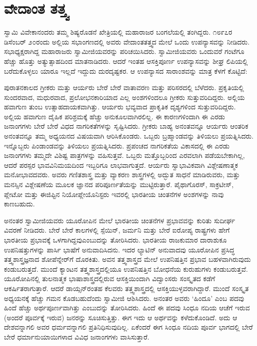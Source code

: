 
\chapter{ವೇದಾಂತ ತತ್ತ್ವ}

ಸ್ವಾಮಿ ವಿವೇಕಾನಂದರು ತಮ್ಮ ಶಿಷ್ಯರೊಡನೆ ಖೇತ್ರಿಯಲ್ಲಿ ಮಹಾರಾಜರ ಬಂಗಲೆಯಲ್ಲಿ ತಂಗಿದ್ದರು. ೧೮೯೭ರ ಡಿಸೆಂಬರ್​ ೨೦ರಂದು ಅಲ್ಲಿಯ ಸಭಾಂಗಣದಲ್ಲಿ ಅವರು ವೇದಾಂತತತ್ತ್ವದ ಮೇಲೆ ಒಂದು ಉಪನ್ಯಾಸವನ್ನು ನೀಡಿದರು. ಸಭಾಧ್ಯಕ್ಷರಾಗಿದ್ದ ಮಹಾರಾಜರು ಸ್ವಾಮೀಜಿಯವರನ್ನು ಪರಿಚಯಿಸಿದರು. ಸ್ವಾಮೀಜಿಯವರು ಒಂದುವರೆ ಗಂಟೆಗೂ ಹೆಚ್ಚು ಹೊತ್ತು ಅತ್ಯುತ್ಸಾಹದಿಂದ ಮಾತನಾಡಿದರು. ಆದರೆ ಇಂತಹ ಆಸಕ್ತಿಪೂರ್ಣ ಉಪನ್ಯಾಸವನ್ನು ಶೀಘ್ರ ಲಿಪಿಯಲ್ಲಿ ಬರೆದುಕೊಳ್ಳಲು ಯಾರೂ ಇಲ್ಲದೆ ಇದ್ದುದು ದುರದೃಷ್ಟಕರ. ಆ ಉಪನ್ಯಾಸದ ಸಾರಾಂಶವನ್ನು ಮಾತ್ರ ಕೆಳಗೆ ಕೊಟ್ಟಿದೆ:

\vskip 5pt

ಪುರಾತನಕಾಲದ ಗ್ರೀಕರು ಮತ್ತು ಆರ್ಯರು ಬೇರೆ ಬೇರೆ ವಾತಾವರಣ ಮತ್ತು ಪರಿಸರದಲ್ಲಿ ಬೆಳೆದರು. ಪ್ರಕೃತಿಯಲ್ಲಿ ಸುಂದರವಾದ, ಮಧುರವಾದ, ಪ್ರಲೋಭನಕಾರಿಯಾದ ಎಲ್ಲ ಅಂಶಗಳಿಂದಲೂ ಗ್ರೀಕರು ಸುತ್ತುವರಿದಿದ್ದರು. ಅಲ್ಲಿಯ ಹವಾಗುಣ ತುಂಬ ಉತ್ಸಾಹದಾಯಕವಾಗಿತ್ತು. ಆರ್ಯರು ಭವ್ಯವಾದ ಪ್ರಾಕೃತಿಕ ದೃಶ್ಯಗಳಿಂದ ಸುತ್ತುವರಿದಿದ್ದರು. ಅಲ್ಲಿಯ ಹವಾಗುಣ ದೈಹಿಕ ಪರಿಶ್ರಮಕ್ಕೆ ಹೆಚ್ಚು ಅನುಕೂಲವಾಗಿರಲಿಲ್ಲ. ಈ ಕಾರಣಗಳಿಂದಾಗಿ ಈ ಎರಡು ಜನಾಂಗಗಳು ಬೇರೆ ಬೇರೆ ವಿಧದ ನಾಗರಿಕತೆ\break ಗಳನ್ನು ಸೃಷ್ಟಿಸಿದರು. ಗ್ರೀಕರು ಬಾಹ್ಯ ಅನಂತವನ್ನೂ ಆರ್ಯರು ಆಂತರಿಕ ಅನಂತವನ್ನೂ ತಮ್ಮ ಅಧ್ಯಯನದ ವಿಷಯವಾಗಿ ಆರಿಸಿಕೊಂಡರು. ಒಬ್ಬರು ಬ್ರಹ್ಮಾಂಡವನ್ನು ತಿಳಿಯಲು ಪ್ರಯತ್ನಿಸಿದರು. ಇನ್ನೊಬ್ಬರು ಪಿಂಡಾಂಡವನ್ನು ತಿಳಿಯಲು ಪ್ರಯತ್ನಿಸಿದರು. ಪ್ರಪಂಚದ ನಾಗರಿಕತೆಯ ವಿಕಾಸದಲ್ಲಿ ಈ ಎರಡು ಜನಾಂಗಗಳು ತಮ್ಮದೇ ವಿಶಿಷ್ಟ ಪಾತ್ರಗಳನ್ನು ವಹಿಸುತ್ತವೆ. ಒಬ್ಬರು ಮತ್ತೊಬ್ಬರಿಂದ ಎರವಲಾಗಿ ಪಡೆಯಬೇಕಾಗಿಲ್ಲ, ಆದರೆ ಪರಸ್ಪರ ಭಾವವಿನಿಮಯದಿಂದ ಇಬ್ಬರಿಗೂ ಲಾಭವಾಗುತ್ತದೆ. ಆರ್ಯರು ಸ್ವಾಭಾವಿಕವಾಗಿ ವಿಶ್ಲೇಷಣಾತ್ಮಕ ಮನೋಭಾವದವರು. ಅವರು ಗಣಿತಶಾಸ್ತ್ರ ಮತ್ತು ವ್ಯಾಕರಣ ಶಾಸ್ತ್ರಗಳಲ್ಲಿ ಅದ್ಭುತ ಸಾಧನೆ ಮಾಡಿರುವರು, ಮತ್ತು ಮನಸ್ಸಿನ ವಿಶ್ಲೇಷಣೆಯ ಮೂಲಕ ಜ್ಞಾನದ ಪರಿಪೂರ್ಣತೆಯನ್ನು ಮುಟ್ಟಿರುತ್ತಾರೆ. ಪೈಥಾಗೊರಸ್​, ಸಾಕ್ರಟೀಸ್​, ಪ್ಲೇಟೋ ಮತ್ತು ಈಜಿಪ್ಟಿನ ನಿಯೋಪ್ಲೇಯೊನಿಸ್ಟರು ಇವರಲ್ಲಿ ಭಾರತೀಯ ಚಿಂತನೆಗಳ ಅಂಶಗಳನ್ನು ನಾವು ಕಾಣಬಹುದು.

\vskip 5pt

ಅನಂತರ ಸ್ವಾಮೀಜಿಯವರು ಯೂರೋಪಿನ ಮೇಲೆ ಭಾರತೀಯ ಚಿಂತನೆಗಳ ಪ್ರಭಾವವನ್ನು ಕುರಿತು ಸುದೀರ್ಘ ವಿವರಣೆ ನೀಡಿದರು. ಬೇರೆ ಬೇರೆ ಕಾಲಗಳಲ್ಲಿ ಸ್ಪೆಯಿನ್​, ಜರ್ಮನಿ ಮತ್ತು ಬೇರೆ ಐರೋಪ್ಯ ರಾಷ್ಟ್ರಗಳು ಹೇಗೆ ಭಾರತೀಯ ಪ್ರಭಾವಕ್ಕೆ ಒಳಗಾಗಿದ್ದವು\break ಎಂಬುದನ್ನು ತೋರಿಸಿದರು. ಭಾರತೀಯ ರಾಜಕುಮಾರ ದಾರಾಶುಕೂ ಉಪನಿಷತ್ತುಗಳನ್ನು ಪಾರ್ಸಿ ಭಾಷೆಗೆ ಅನುವಾದಿಸಿದನು. ಇದರ ಲ್ಯಾಟಿನ್​ ಅನುವಾದವು ಯೂರೋಪಿನ ಪ್ರಸಿದ್ಧ ತತ್ತ್ವಶಾಸ್ತ್ರಜ್ಞನಾದ ಶೋಪೆನ್ನೇರ್​ಗೆ ದೊರಕಿತು. ಅವನ ತತ್ತ್ವಶಾಸ್ತ್ರದ ಮೇಲೆ ಉಪನಿಷತ್ತಿನ ಪ್ರಭಾವ ಬಹಳವಾಗಿರುವುದು ಕಂಡುಬರುತ್ತದೆ. ಮುಂದೆ ಕ್ಯಾಂಟನ ತತ್ತ್ವಶಾಸ್ತ್ರದಲ್ಲಿಯೂ ಉಪನಿಷತ್ತಿನ ಬೋಧನೆಯ ಕುರುಹುಗಳು ಕಂಡುಬರುತ್ತವೆ. ಯೂರೋಪಿನಲ್ಲಿ ತುಲನಾತ್ಮಕ ಭಾಷಾಶಾಸ್ತ್ರದಲ್ಲಿರುವ ಆಸಕ್ತಿಯಿಂದಾಗಿ ವಿದ್ವಾಂಸರು ಸಂಸ್ಕೃತದ ಕಡೆಗೆ ಆಕರ್ಷಿತರಾಗುತ್ತಾರೆ. ಆದರೆ ಡಾಯ್ಸನ್​ರಂತಹ ಕೆಲವರು ತತ್ತ್ವಶಾಸ್ತ್ರದಲ್ಲಿ ಆಸಕ್ತಿಯುಳ್ಳವರಾಗಿದ್ದಾರೆ. ಮುಂದೆ ಸಂಸ್ಕೃತ ಅಧ್ಯಯನಕ್ಕೆ ಹೆಚ್ಚು ಗಮನ ಕೊಡಬಹುದೆಂದು ಸ್ವಾಮೀಜಿ ಆಶಿಸಿದರು. ಅನಂತರ ಅವರು ‘ಹಿಂದೂ’ ಎಂಬ ಪದವು ಹಿಂದೆ ಹೆಚ್ಚು ಅರ್ಥಪೂರ್ಣವಾಗಿತ್ತು ಎಂಬುದನ್ನು ತೋರಿಸಿದರು. ಹಿಂದೆ ಈ ಪದವು ಸಿಂಧೂ ನದಿಯ ಆಚೆಗೆ ಇರುವ (ಅಂದರೆ ಪೂರ್ವಕ್ಕೆ ಇರುವ) ಜನರನ್ನು ಸೂಚಿಸುತ್ತಿತ್ತು. ಈಗ ಇದು ಆ ಅರ್ಥವನ್ನು ಕಳೆದುಕೊಂಡಿದೆ. ಅದು ಆ ದೇಶವನ್ನಾಗಲಿ ಅವರ ಧರ್ಮವನ್ನಾಗಲಿ ಪ್ರತಿನಿಧಿಸುವುದಿಲ್ಲ. ಏಕೆಂದರೆ ಈಗ ಸಿಂಧೂ ನದಿಯ ಪೂರ್ವ ಭಾಗದಲ್ಲಿ ಬೇರೆ ಬೇರೆ ಧರ್ಮಾನುಯಾಯಿಗಳಾದ ವಿವಿಧ ಜನಾಂಗಗಳು ವಾಸಿಸುತ್ತಾರೆ.

